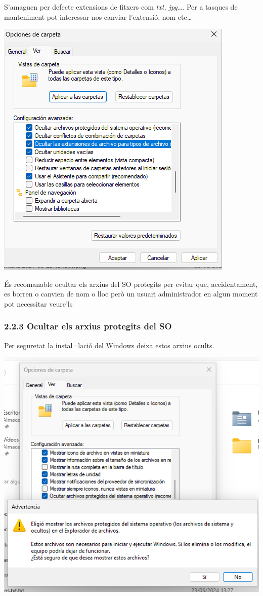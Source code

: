 \documentclass[
  a4paper,
]{article}
\begin{document}
S'amaguen per defecte extensions de fitxers com \emph{txt, jpg\ldots{}}.
Per a tasques de manteniment pot interessar-nos canviar l'extensió, nom
etc\ldots{}

\includegraphics{png/veropcionesCarpeta3.png}

És recomanable ocultar els arxius del SO protegits per evitar que,
accidentament, es borren o canvien de nom o lloc però un usuari
administrador en algun moment pot necessitar veure'ls

\subsubsection{2.2.3 Ocultar els arxius protegits del
SO}\label{ocultar-els-arxius-protegits-del-so}

Per seguretat la instal·lació del Windows deixa estos arxius ocults.

\includegraphics{png/veropcionesCarpeta4.png}
\end{document}
